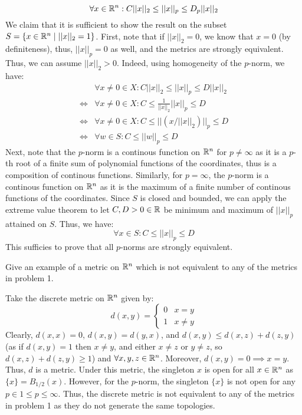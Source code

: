 \documentclass[12pt]{article}
\begin{document}
\begin{solution}
    \[ \forall x \in \mathbb R^n : C ||x||_2 \leq ||x||_p \leq D_p ||x||_2 \]
    We claim that it is sufficient to show the result on the subset $S = \{x \in \mathbb R^n \mid ||x||_2 = 1\}$. First, note that if $||x||_2 = 0$, we know that $x = 0$ (by definiteness), thus, $||x||_p = 0$ as well, and the metrics are strongly equivalent. Thus, we can assume $||x||_2 > 0$.
    Indeed, using homogeneity of the $p$-norm, we have:
    \begin{align*}
        &\forall x \neq 0 \in X: C ||x||_2 \leq ||x||_p \leq D ||x||_2 \\
        \iff &\forall x \neq 0 \in X: C \leq \frac{1}{||x||_2} ||x||_p \leq D \\
        \iff &\forall x \neq 0 \in X: C \leq  || (x/||x||_2)||_p \leq D \\
        \iff &\forall w \in S: C \leq ||w||_p \leq D
    \end{align*}
    Next, note that the $p$-norm is a continous function on $\mathbb R^n$ for $p \neq \infty$ as it is a $p$-th root of a finite sum of polynomial functions of the coordinates, thus is a composition of continous functions. Similarly, for $p = \infty$, the $p$-norm is a continous function on $\mathbb R^n$ as it is the maximum of a finite number of continous functions of the coordinates. Since $S$ is closed and bounded, we can apply the extreme value theorem to let $C, D > 0 \in \mathbb R$ be minimum and maximum of $||x||_p$ attained on $S$. Thus, we have:
    \[ \forall x \in S: C \leq ||x||_p \leq D \]
    This sufficies to prove that all $p$-norms are strongly equivalent.
\end{solution}

\newpage

\begin{problem}{2}
    Give an example of a metric on $\mathbb R^n$ which is not equivalent to any of the metrics in problem 1.
\end{problem}
\begin{solution}
    Take the discrete metric on $\mathbb R^n$ given by:
    \[ d(x,y) = \begin{cases}
        0 & x = y \\
        1 & x \neq y
    \end{cases} \]
    Clearly, $d(x,x) = 0$, $d(x,y) = d(y,x)$, and $d(x,y) \leq d(x,z) + d(z,y)$ (as if $d(x,y) = 1$ then $x \neq y$, and either $x \neq z$ or $y\neq z$, so $d(x,z)+d(z,y) \geq 1$) and $\forall x, y, z \in \mathbb R^n$. Moreover, $d(x,y) = 0 \implies x = y$. Thus, $d$ is a metric. \bbni
    Under this metric, the singleton ${x}$ is open for all $x \in \mathbb R^n$ as $\{x\} = B_{1/2}(x)$. However, for the $p$-norm, the singleton $\{x\}$ is not open for any $p \in 1\leq p \leq \infty$. Thus, the discrete metric is not equivalent to any of the metrics in problem 1 as they do not generate the same topologies.
\end{solution}
\end{document}
